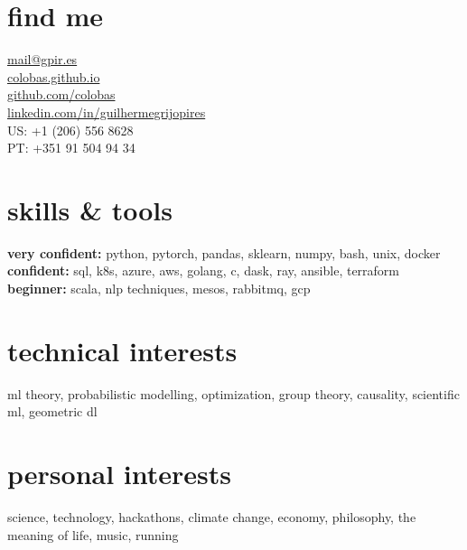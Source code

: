 \documentclass[]{colobas-cv}
\begin{document}

\begin{minipage}[t]{0.3\textwidth}
\section{find me}
  \vspace{7pt}
  \href{mailto:mail@gpir.es}{mail@gpir.es}\\
  \href{https://colobas.github.io}{colobas.github.io}\\
  \href{https://github.com/colobas}{github.com/colobas}\\
  \href{https://linkedin.com/in/guilhermegrijopires/}{linkedin.com/in/guilhermegrijopires}\\
  US: +1 (206) 556 8628\\
  PT: +351 91 504 94 34%
\end{minipage}
\hfill
\begin{minipage}[t]{0.3\textwidth}
\section{skills \& tools}
  \vspace{7pt}
  \textbf{very confident:} python, pytorch, pandas, sklearn, numpy, bash, unix, docker\\
  \textbf{confident:} sql, k8s, azure, aws, golang, c, dask, ray, ansible, terraform\\
  \textbf{beginner:} scala, nlp techniques, mesos, rabbitmq, gcp%
\end{minipage}
\hfill
\begin{minipage}[t]{0.3\textwidth}
\section{technical interests}
  \vspace{7pt}
  ml theory, probabilistic modelling, optimization, group theory, causality,
  scientific ml, geometric dl%
  \vspace{15pt}
\section{personal interests}
  \vspace{7pt}
  science, technology, hackathons, climate change, economy, philosophy, the meaning of life,
  music, running
\end{minipage}

\vspace{0.5cm}
\end{document}
